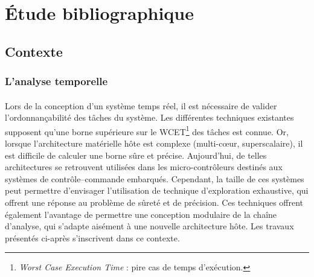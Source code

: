 \section{Étude bibliographique}
\label{sec:biblio}
  \subsection{Contexte}
    \subsubsection{L'analyse temporelle}
    


        

      \paragraph{}
      { Lors de la conception d'un système temps réel, il est nécessaire de
        valider l'ordonnançabilité des tâches du système. Les différentes
        techniques existantes supposent qu'une borne supérieure sur le
        WCET\footnote{{\em Worst Case Execution Time} : pire cas de temps
          d'exécution.} des tâches est connue. Or, lorsque l'architecture
        matérielle hôte est complexe (multi-c{\oe}ur, superscalaire), il est
        difficile de calculer une borne sûre et précise. Aujourd'hui, de telles
        architectures se retrouvent utilisées dans les micro-contrôleurs
        destinés aux systèmes de contrôle--commande embarqués. Cependant, la
        taille de ces systèmes peut permettre d'envisager l'utilisation de
        technique d'exploration exhaustive, qui offrent une réponse au problème
        de sûreté et de précision. Ces techniques offrent également l'avantage
        de permettre une conception modulaire de la chaîne d'analyse, qui
        s'adapte aisément à une nouvelle architecture hôte. Les travaux
        présentés ci-après s'inscrivent dans ce contexte. }

